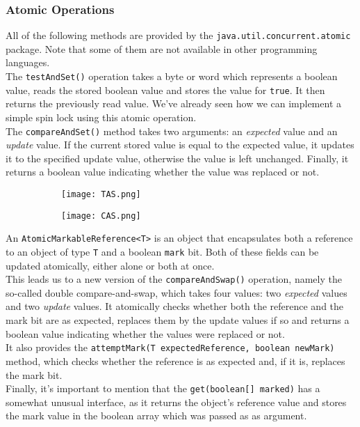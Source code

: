 \documentclass[main]{subfiles}
\begin{document}
\subsubsection{Atomic Operations}
All of the following methods are provided by the \texttt{java.util.concurrent.atomic} package. Note that some of them are not available in other programming languages.\\[3mm]
The \texttt{testAndSet()} operation takes a byte or word which represents a boolean value, reads the stored boolean value and stores the value for \texttt{true}. It then returns the previously read value. We've already seen how we can implement a simple spin lock using this atomic operation.\\[3mm]
The \texttt{compareAndSet()} method takes two arguments: an \textit{expected} value and an \textit{update} value. If the current stored value is equal to the expected value, it updates it to the specified update value, otherwise the value is left unchanged. Finally, it returns a boolean value indicating whether the value was replaced or not.\\
\begin{figure}[H]
    \centering
    \begin{subfigure}{.5\textwidth}
        \centering
        \texttt{[image: TAS.png]}
    \end{subfigure}%
    \begin{subfigure}{.5\textwidth}
        \centering
        \texttt{[image: CAS.png]}
    \end{subfigure}
\end{figure}
\noindent An \texttt{AtomicMarkableReference<T>} is an object that encapsulates both a reference to an object of type \texttt{T} and a boolean \texttt{mark} bit. Both of these fields can be updated atomically, either alone or both at once.\\
This leads us to a new version of the \texttt{compareAndSwap()} operation, namely the so-called double compare-and-swap, which takes four values: two \textit{expected} values and two \textit{update} values. It atomically checks whether both the reference and the mark bit are as expected, replaces them by the update values if so and returns a boolean value indicating whether the values were replaced or not.\\
It also provides the \texttt{attemptMark(T expectedReference, boolean newMark)} method, which checks whether the reference is as expected and, if it is, replaces the mark bit. \\
Finally, it's important to mention that the \texttt{get(boolean[] marked)} has a somewhat unusual interface, as it returns the object's reference value and stores the mark value in the boolean array which was passed as as argument.
\end{document}
